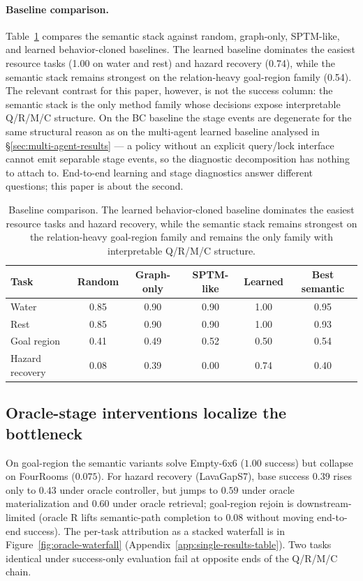\documentclass{article}
\begin{document}
\paragraph{Baseline comparison.}
Table~\ref{tab:baselines} compares the semantic stack against random,
graph-only, SPTM-like, and learned behavior-cloned baselines. The
learned baseline dominates the easiest resource tasks (1.00 on water
and rest) and hazard recovery (0.74), while the semantic stack remains
strongest on the relation-heavy goal-region family (0.54). The
relevant contrast for this paper, however, is not the success column:
the semantic stack is the only method family whose decisions expose
interpretable Q/R/M/C structure. On the BC baseline the stage events
are degenerate for the same structural reason as on the multi-agent
learned baseline analysed in \S\ref{sec:multi-agent-results} --- a
policy without an explicit query/lock interface cannot emit separable
stage events, so the diagnostic decomposition has nothing to attach
to. End-to-end learning and stage diagnostics answer different
questions; this paper is about the second.

\begin{table}[t]
  \caption{Baseline comparison. The learned behavior-cloned baseline dominates the easiest resource tasks and hazard recovery, while the semantic stack remains strongest on the relation-heavy goal-region family and remains the only family with interpretable Q/R/M/C structure.}
  \label{tab:baselines}
  \centering
  \small
  \begin{tabular}{p{1.9cm}c c c c c}
    \toprule
    Task & Random & Graph-only & SPTM-like & Learned & Best semantic \\
    \midrule
    Water & 0.85 & 0.90 & 0.90 & 1.00 & 0.95 \\
    Rest & 0.85 & 0.90 & 0.90 & 1.00 & 0.93 \\
    Goal region & 0.41 & 0.49 & 0.52 & 0.50 & 0.54 \\
    Hazard recovery & 0.08 & 0.39 & 0.00 & 0.74 & 0.40 \\
    \bottomrule
  \end{tabular}
\end{table}

\subsection{Oracle-stage interventions localize the bottleneck}
\label{sec:oracle}

On goal-region the semantic variants solve Empty-6x6 ($1.00$ success) but collapse on FourRooms ($0.075$). For hazard recovery (LavaGapS7), base success $0.39$ rises only to $0.43$ under oracle controller, but jumps to $0.59$ under oracle materialization and $0.60$ under oracle retrieval; goal-region rejoin is downstream-limited (oracle R lifts semantic-path completion to $0.08$ without moving end-to-end success). The per-task attribution as a stacked waterfall is in Figure~\ref{fig:oracle-waterfall} (Appendix~\ref{app:single-results-table}). Two tasks identical under success-only evaluation fail at opposite ends of the Q/R/M/C chain.
\end{document}
